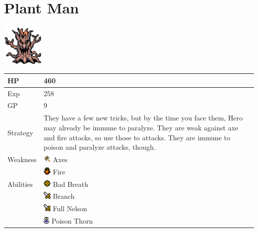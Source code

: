 \section{Plant Man}
\label{monster:plant_man}

\includegraphics[height=2cm,keepaspectratio]{./resources/monster/plant_man}

\begin{longtable}{ l p{9cm} }
	HP
	& 460
\\ \hline
	Exp
	& 258
\\ \hline
	GP
	& 9
\\ \hline
	Strategy
	& They have a few new tricks, but by the time you face them, Hero may already be immune to paralyze. They are weak against axe and fire attacks, so use those to attacks. They are immune to poison and paralyze attacks, though.
\\ \hline
	Weakness
	& \includegraphics[height=1em,keepaspectratio]{./resources/effects/axe} Axes \\
	& \includegraphics[height=1em,keepaspectratio]{./resources/effects/fire} Fire
\\ \hline
	Abilities
	& \includegraphics[height=1em,keepaspectratio]{./resources/effects/paralyze} Bad Breath \\
	& \includegraphics[height=1em,keepaspectratio]{./resources/effects/damage} Branch \\
	& \includegraphics[height=1em,keepaspectratio]{./resources/effects/damage} Full Nelson \\
	& \includegraphics[height=1em,keepaspectratio]{./resources/effects/poison} Poison Thorn
\end{longtable}

